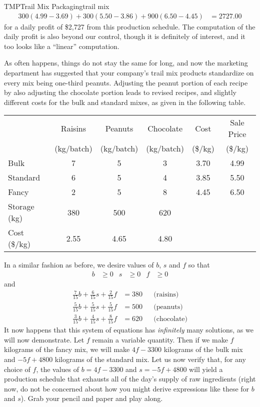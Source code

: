 \begin{example}{TMP}{Trail Mix Packaging}{trail mix}
%
\begin{align*}
300(4.99-3.69)+300(5.50-3.86)+900(6.50-4.45)&=2727.00
\end{align*}
%
for a daily profit of \$2,727 from this production schedule. The computation of the daily profit is also beyond our control, though it is definitely of interest, and it too looks like a ``linear'' computation.\par
%
As often happens, things do not stay the same for long, and now the marketing department has suggested that your company's trail mix products standardize on every mix being one-third peanuts.  Adjusting the peanut portion of each recipe by also adjusting the chocolate portion leads to revised recipes, and slightly different costs for the bulk and standard mixes, as given in the following table.\par
%
\begin{center}
\begin{tabular}{l*5{|c}}
&Raisins&Peanuts&Chocolate&Cost&Sale Price\\
&(kg/batch)&(kg/batch)&(kg/batch)&(\$/kg)&(\$/kg)\\\hline\hline
Bulk&7&5&3&3.70&4.99\\\hline
Standard&6&5&4&3.85&5.50\\\hline
Fancy&2&5&8&4.45&6.50\\\hline\hline
Storage (kg)&380&500&620&&\\\hline
Cost (\$/kg)&2.55&4.65&4.80&&
\end{tabular}
\end{center}
\par
%
In a similar fashion as before, we desire values of $b$, $s$ and $f$ so that
%
\begin{align*}
b&\geq 0  &  s&\geq 0  &  f&\geq 0
\end{align*}
%
and
\begin{align*}
\frac{7}{15}b+\frac{6}{15}s+\frac{2}{15}f&=380&&\text{(raisins)}\\
\frac{5}{15}b+\frac{5}{15}s+\frac{5}{15}f&=500&&\text{(peanuts)}\\
\frac{3}{15}b+\frac{4}{15}s+\frac{8}{15}f&=620&&\text{(chocolate)}
\end{align*}
%
It now happens that this system of equations has {\em infinitely} many solutions, as we will now demonstrate.  Let $f$ remain a variable quantity.  Then if we make $f$ kilograms of the fancy mix, we will make $4f-3300$ kilograms of the bulk mix and $-5f+4800$ kilograms of the standard mix.  Let us now verify that, for any choice of $f$, the values of $b=4f-3300$ and $s=-5f+4800$ will yield a production schedule that exhausts all of the day's supply of raw ingredients (right now, do not be concerned about how you might derive expressions like these for $b$ and $s$).  Grab your pencil and paper and play along.

\end{example}
